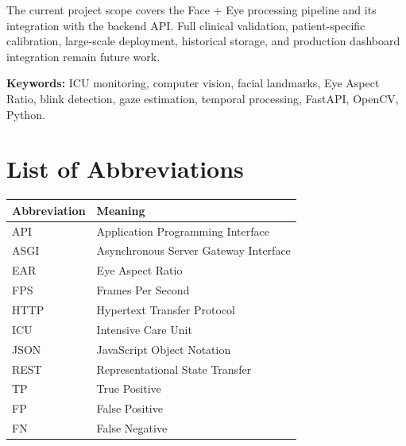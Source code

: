 \documentclass{tietreport}
\begin{document}
The current project scope covers the Face + Eye processing pipeline and
its integration with the backend API. Full clinical validation,
patient-specific calibration, large-scale deployment, historical
storage, and production dashboard integration remain future work.

\noindent\textbf{Keywords:}
ICU monitoring, computer vision, facial landmarks, Eye Aspect Ratio,
blink detection, gaze estimation, temporal processing, FastAPI,
OpenCV, Python.


\chapter*{List of Abbreviations}


\begin{tabularx}{\textwidth}{@{}lY@{}}

\toprule
\textbf{Abbreviation} & \textbf{Meaning}\\
\midrule

API & Application Programming Interface\\
ASGI & Asynchronous Server Gateway Interface\\
EAR & Eye Aspect Ratio\\
FPS & Frames Per Second\\
HTTP & Hypertext Transfer Protocol\\
ICU & Intensive Care Unit\\
JSON & JavaScript Object Notation\\
REST & Representational State Transfer\\
TP & True Positive\\
FP & False Positive\\
FN & False Negative\\

\bottomrule

\end{tabularx}


\tableofcontents

\end{document}
